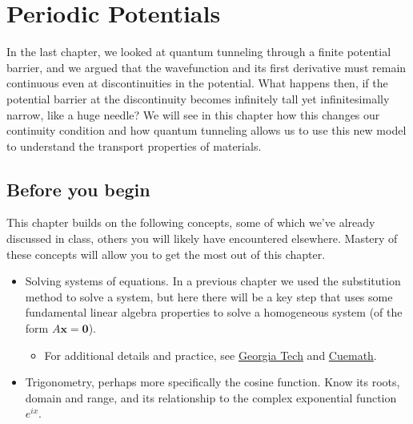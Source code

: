 

%

\chapter{Periodic Potentials} \label{ch:period}
In the last chapter, we looked at quantum tunneling through a finite potential barrier, and we argued that the wavefunction and its first derivative must remain continuous even at discontinuities in the potential. 
What happens then, if the potential barrier at the discontinuity becomes infinitely tall yet infinitesimally narrow, like a huge needle? 
We will see in this chapter how this changes our continuity condition and how quantum tunneling allows us to use this new model to understand the transport properties of materials.


\section{Before you begin}

This chapter builds on the following concepts, some of which we've already discussed in class, others you will likely have encountered elsewhere.
Mastery of these concepts will allow you to get the most out of this chapter.

\begin{itemize}
	\item Solving systems of equations.
	In a previous chapter we used the substitution method to solve a system, but here there will be a key step that uses some fundamental linear algebra properties to solve a homogeneous system (of the form $A \mathbf{x} = \mathbf{0}$).
	\begin{itemize}
		\item For additional details and practice, see \href{https://textbooks.math.gatech.edu/ila/solution-sets.html}{Georgia Tech} and \href{https://www.cuemath.com/algebra/homogeneous-system-of-linear-equations/}{Cuemath}.
	\end{itemize}

	\item Trigonometry, perhaps more specifically the cosine function.
	Know its roots, domain and range, and its relationship to the complex exponential function $e^{ix}$.
\end{itemize}

